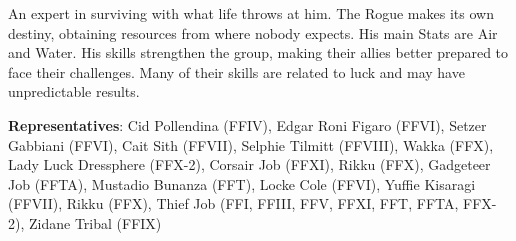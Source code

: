 \begin{jobdesc}[name=pjob-rogue]
    An expert in surviving with what life throws at him. The Rogue makes its own destiny, obtaining resources from where nobody expects. His main Stats are Air and Water. His skills strengthen the group, making their allies better prepared to face their challenges. Many of their skills are related to luck and may have unpredictable results. \pc%

    \textbf{Representatives}: Cid Pollendina (FFIV), Edgar Roni Figaro (FFVI), Setzer Gabbiani (FFVI), Cait Sith (FFVII), Selphie Tilmitt (FFVIII), Wakka (FFX), Lady Luck Dressphere (FFX-2), Corsair Job (FFXI), Rikku (FFX), Gadgeteer Job (FFTA), Mustadio Bunanza (FFT), Locke Cole (FFVI), Yuffie Kisaragi (FFVII), Rikku (FFX), Thief Job (FFI, FFIII, FFV, FFXI, FFT, FFTA, FFX-2), Zidane Tribal (FFIX) \pc%

    \jobstats[hpa=4x,hpb=5x,hpc=6x,hpd=7x,mpa=0x,mpb=1x,mpc=2x,armor=Medium,weapons= \tequip{Polearms} \\ \tequip{Light Swords / Knives} \\ \tequip{Katana} \\ \tequip{Rifles / Crossbows} \\ and \tequip{Throwing Weapons}] 
\end{jobdesc}

